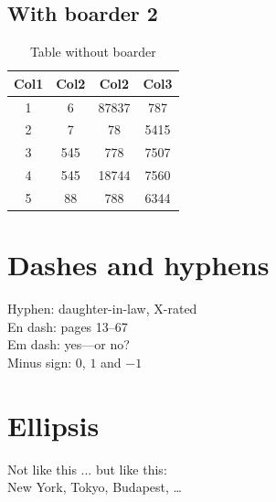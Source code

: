 \documentclass[12pt, letterpaper, twoside]{article}
\begin{document}
\subsection{With boarder 2}
\begin{table}[h!]
\begin{center}
 \begin{tabular}{||c c c c||} 
 \hline
 Col1 & Col2 & Col2 & Col3 \\ [0.5ex] 
 \hline\hline
 1 & 6 & 87837 & 787 \\ 
 \hline
 2 & 7 & 78 & 5415 \\
 \hline
 3 & 545 & 778 & 7507 \\
 \hline
 4 & 545 & 18744 & 7560 \\
 \hline
 5 & 88 & 788 & 6344 \\ [1ex] 
 \hline
\end{tabular}
\end{center}
\caption{Table without boarder}
\label{table:data3}
\end{table}

\section{Dashes and hyphens}
Hyphen: daughter-in-law, X-rated\\
En dash: pages 13--67\\
Em dash: yes---or no? \\
Minus sign: $0$, $1$ and $-1$

\section{Ellipsis}
Not like this ... but like this:\\
New York, Tokyo, Budapest, \ldots
\end{document}
